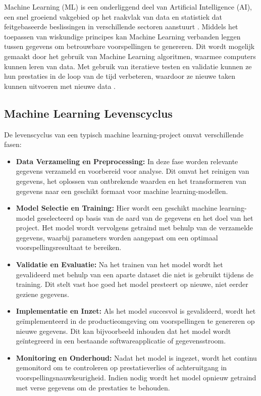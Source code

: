 Machine Learning (ML) is een onderliggend deel van Artificial Intelligence (AI), een snel groeiend vakgebied op het raakvlak van data en statistiek dat feitgebaseerde beslissingen in verschillende sectoren aanstuurt \autocite{Jordan2015}. Middels het toepassen van wiskundige principes kan Machine Learning verbanden leggen tussen gegevens om betrouwbare voorspellingen te genereren. Dit wordt mogelijk gemaakt door het gebruik van Machine Learning algoritmen, waarmee computers kunnen leren van data. Met gebruik van iteratieve testen en validatie kunnen ze hun prestaties in de loop van de tijd verbeteren, waardoor ze nieuwe taken kunnen uitvoeren met nieuwe data \autocite{Shaveta2023}.

\subsection{Machine Learning Levenscyclus}

De levenscyclus van een typisch machine learning-project omvat verschillende fasen:

\begin{itemize}
    \item \textbf{Data Verzameling en Preprocessing:} In deze fase worden relevante gegevens verzameld en voorbereid voor analyse. Dit omvat het reinigen van gegevens, het oplossen van ontbrekende waarden en het transformeren van gegevens naar een geschikt formaat voor machine learning-modellen.
    \item \textbf{Model Selectie en Training:} Hier wordt een geschikt machine learning-model geselecteerd op basis van de aard van de gegevens en het doel van het project. Het model wordt vervolgens getraind met behulp van de verzamelde gegevens, waarbij parameters worden aangepast om een optimaal voorspellingsresultaat te bereiken.
    \item \textbf{Validatie en Evaluatie:}  Na het trainen van het model wordt het gevalideerd met behulp van een aparte dataset die niet is gebruikt tijdens de training. Dit stelt vast hoe goed het model presteert op nieuwe, niet eerder geziene gegevens.
    \item \textbf{Implementatie en Inzet:}  Als het model succesvol is gevalideerd, wordt het geïmplementeerd in de productieomgeving om voorspellingen te genereren op nieuwe gegevens. Dit kan bijvoorbeeld inhouden dat het model wordt geïntegreerd in een bestaande softwareapplicatie of gegevensstroom.
    \item \textbf{Monitoring en Onderhoud:}  Nadat het model is ingezet, wordt het continu gemonitord om te controleren op prestatieverlies of achteruitgang in voorspellingsnauwkeurigheid. Indien nodig wordt het model opnieuw getraind met verse gegevens om de prestaties te behouden.
  \end{itemize}

